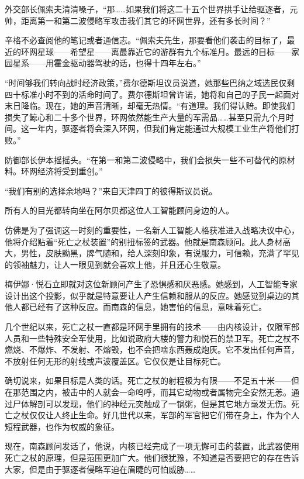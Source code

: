 \documentclass[AutoFakeBold=true]{book}
\begin{document}
外交部长佩索夫清清嗓子，``那……如果我们将这二十五个世界拱手让给驱逐者，元帅，距离第一和第二波侵略军攻击我们其它的环网世界，还有多长时间？''

辛格不必查阅他的笔记或者通信志。``佩索夫先生，那要看他们袭击的目标了，最近的环网星球——希望星——离最靠近它的游群有九个标准月。最远的目标——家园星系——用霍金驱动器驾驶的话，也得十四年左右。''

``时间够我们转向战时经济政策，''费尔德斯坦议员说道，她那些巴纳之域选民仅剩四十标准小时不到的活命时间了。费尔德斯坦曾许诺，她将和自己的子民一起面对末日降临。现在，她的声音清晰，却毫无热情。``有道理。我们得认赔。即使我们损失了鲸心和二十多个世界，环网依然能生产大量的军需品……甚至只需九个月时间。这一年内，驱逐者将会深入环网，但我们肯定能通过大规模工业生产将他们打败。''

防御部长伊本摇摇头。``在第一和第二波侵略中，我们会损失一些不可替代的原材料。环网经济将受到重创。''

``我们有别的选择余地吗？''来自天津四丁的彼得斯议员说。

所有人的目光都转向坐在阿尔贝都这位人工智能顾问身边的人。

仿佛是为了强调这一时刻的重要性，一名新人工智能人格获准进入战略决议中心，他将介绍贴着``死亡之杖装置''的别扭标签的武器。他就是南森顾问。此人身材高大，男性，皮肤黝黑，脾气随和，给人深刻印象，有说服力，可信赖，充满了罕见的领袖魅力，让人一眼见到就会喜欢上他，并且还心生敬意。

梅伊娜·悦石立即就对这位新顾问产生了恐惧感和厌恶感。她感到，人工智能专家设计出这个投影，似乎就是特意要让人产生信赖和服从的反应。她感觉到桌边的其他人都已经有了这种反应。而南森的信息，她害怕的信息，意味着死亡。

几个世纪以来，死亡之杖一直都是环网手里拥有的技术——由内核设计，仅限军部人员和一些特殊安全军使用，比如说政府大楼的警力和悦石的禁卫军。死亡之杖不燃烧、不爆炸、不发射、不熔毁，也不会把啥东西轰成炮灰。它不发出任何声音，不放射任何无形的射线或声波覆盖区。它仅仅是让目标死亡。

确切说来，如果目标是人类的话。死亡之杖的射程极为有限——不足五十米——但在那范围之内，被击中的人就会一命呜呼，而其它动物或者属物完全安然无恙。通过尸体解剖可以发现，他们的神经元突触成了一锅粥，但是其它地方毫发无伤。死亡之杖仅仅让人终止生命。好几世代以来，军部的军官把它们带在身上，作为个人短程武器，也作为权威的象征。

现在，南森顾问发话了，他说，内核已经完成了一项无懈可击的装置，此武器使用死亡之杖的原理，但是范围更加广大。他们很犹豫，不知道是否要把它的存在告诉大家，但是由于驱逐者侵略军迫在眉睫的可怕威胁……
\end{document}
